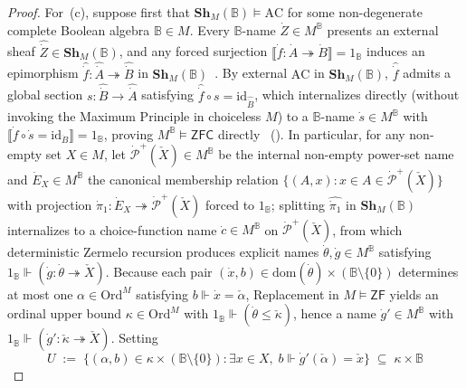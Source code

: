 \begin{proof}
For~(c), suppose first that $\mathbf{Sh}_M(\mathbb{B}) \models \mathrm{AC}$ for some non-degenerate complete Boolean algebra $\mathbb{B} \in M$. Every $\mathbb{B}$-name $\dot{Z} \in M^{\mathbb{B}}$ presents an external sheaf $\widehat{\dot{Z}} \in \mathbf{Sh}_M(\mathbb{B})$, and any forced surjection $\llbracket \dot{f} : \dot{A} \twoheadrightarrow \dot{B} \rrbracket = 1_{\mathbb{B}}$ induces an epimorphism $\widehat{\dot{f}} : \widehat{\dot{A}} \twoheadrightarrow \widehat{\dot{B}}$ in $\mathbf{Sh}_M(\mathbb{B})$~\cite{Fourman80}. By external $\mathrm{AC}$ in $\mathbf{Sh}_M(\mathbb{B})$, $\widehat{\dot{f}}$ admits a global section $s : \widehat{\dot{B}} \to \widehat{\dot{A}}$ satisfying $\widehat{\dot{f}} \circ s = \mathrm{id}_{\widehat{\dot{B}}}$, which internalizes directly (without invoking the Maximum Principle in choiceless $M$) to a $\mathbb{B}$-name $\dot{s} \in M^{\mathbb{B}}$ with $\llbracket \dot{f} \circ \dot{s} = \mathrm{id}_{\dot{B}} \rrbracket = 1_{\mathbb{B}}$, proving $M^{\mathbb{B}} \models \mathsf{ZFC}$ directly~\cite{Fourman80} (\cite[\S D4.5]{Johnstone02}). In particular, for any non-empty set $X \in M$, let $\dot{\mathcal{P}}^+(\check{X}) \in M^{\mathbb{B}}$ be the internal non-empty power-set name and $\dot{E}_X \in M^{\mathbb{B}}$ the canonical membership relation $\{(A, x) : x \in A \in \dot{\mathcal{P}}^+(\check{X})\}$ with projection $\dot{\pi}_1 : \dot{E}_X \twoheadrightarrow \dot{\mathcal{P}}^+(\check{X})$ forced to $1_{\mathbb{B}}$; splitting $\widehat{\dot{\pi}_1}$ in $\mathbf{Sh}_M(\mathbb{B})$ internalizes to a choice-function name $\dot{c} \in M^{\mathbb{B}}$ on $\dot{\mathcal{P}}^+(\check{X})$, from which deterministic Zermelo recursion produces explicit names $\dot{\theta}, \dot{g} \in M^{\mathbb{B}}$ satisfying $1_{\mathbb{B}} \Vdash (\dot{g} : \dot{\theta} \twoheadrightarrow \check{X})$. Because each pair $(\dot{x}, b) \in \mathrm{dom}(\dot{\theta}) \times (\mathbb{B}\setminus\{0\})$ determines at most one $\alpha \in \mathrm{Ord}^M$ satisfying $b \Vdash \dot{x} = \check{\alpha}$, Replacement in $M \models \mathsf{ZF}$ yields an ordinal upper bound $\kappa \in \mathrm{Ord}^M$ with $1_{\mathbb{B}} \Vdash (\dot{\theta} \le \check{\kappa})$, hence a name $\dot{g}' \in M^{\mathbb{B}}$ with $1_{\mathbb{B}} \Vdash (\dot{g}' : \check{\kappa} \twoheadrightarrow \check{X})$. Setting
\[
  U \;:=\; \bigl\{(\alpha, b) \in \kappa \times (\mathbb{B}\setminus\{0\}) : \exists x \in X,\; b \Vdash \dot{g}'(\check{\alpha}) = \check{x}\bigr\} \;\subseteq\; \kappa \times \mathbb{B}
\]

\end{proof}
